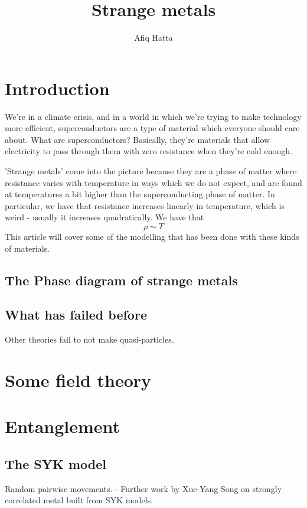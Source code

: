 \documentclass[11pt, oneside]{article}   	%
\title{Strange metals}
\author{Afiq Hatta }
\theoremstyle{slanted}
\begin{document}
 
\maketitle

\section{Introduction} 
We're in a climate crisis, and in a world in which we're trying to make technology more efficient, 
superconductors are a type of material which everyone should care about. 
What are superconductors? Basically, they're materials that allow electricity to pass through 
them with zero resistance when they're cold enough. 

'Strange metals' come into the picture because they are a phase 
of matter where resistance 
varies with temperature in ways which we do not expect, and 
are found at temperatures a bit higher than the 
superconducting phase of matter. 
In particular, we have that resistance increases linearly in temperature, 
which is weird - usually it increases quadratically. 
We have that 
\[
 \rho \sim T  
\] 
This article will cover some of the modelling 
that has been done with these kinds of materials.

\subsection{The Phase diagram of strange metals} 

\subsection{What has failed before} 
Other theories fail to not make quasi-particles. 

\section{Some field theory} 

\section{Entanglement} 

\subsection{The SYK model} 
Random pairwise movements. 
 - Further work by Xue-Yang Song on strongly correlated metal built 
 from SYK models.
\end{document}
